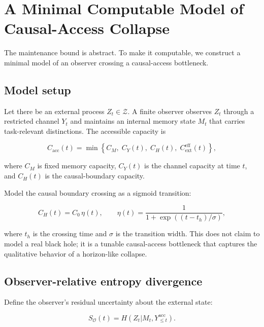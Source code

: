 \documentclass[10pt,a4paper,twocolumn,aps,prl]{revtex4-2}
\begin{document}
\section{A Minimal Computable Model of Causal-Access Collapse}
\label{sec:model}

The maintenance bound is abstract. To make it computable, we construct a minimal model of an observer crossing a causal-access bottleneck.

\subsection{Model setup}

Let there be an external process $Z_t\in\mathcal{Z}$. A finite observer observes $Z_t$ through a restricted channel $Y_t$ and maintains an internal memory state $M_t$ that carries task-relevant distinctions. The accessible capacity is

\begin{equation}
C_{\mathrm{acc}}(t)
=
\min\left\{
C_M,\; C_Y(t),\; C_H(t),\; C_{\mathrm{ext}}^{\mathrm{eff}}(t)
\right\},
\label{eq:toy-cacc}
\end{equation}

where $C_M$ is fixed memory capacity, $C_Y(t)$ is the channel capacity at time $t$, and $C_H(t)$ is the causal-boundary capacity.

Model the causal boundary crossing as a sigmoid transition:

\begin{equation}
C_H(t)
=
C_0\,\eta(t),\qquad
\eta(t)
=
\frac{1}{1+\exp((t-t_h)/\sigma)},
\label{eq:sigmoid-horizon}
\end{equation}

where $t_h$ is the crossing time and $\sigma$ is the transition width. This does not claim to model a real black hole; it is a tunable causal-access bottleneck that captures the qualitative behavior of a horizon-like collapse.

\subsection{Observer-relative entropy divergence}

Define the observer's residual uncertainty about the external state:

\begin{equation}
S_{\mathcal{O}}(t)
=
H(Z_t|M_t,Y_{\leq t}^{\mathrm{acc}}).
\label{eq:observer-entropy}
\end{equation}
\end{document}
